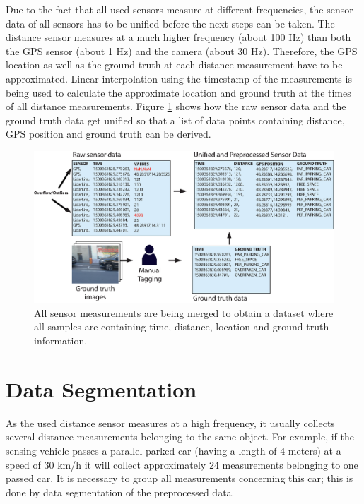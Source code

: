 Due to the fact that all used sensors measure at different frequencies, the sensor data of all sensors has to be unified before the next steps can be taken. The distance sensor measures at a much higher frequency (about 100 Hz) than both the GPS sensor (about 1 Hz) and the camera (about 30 Hz). Therefore, the GPS location as well as the ground truth at each distance measurement have to be approximated. Linear interpolation using the timestamp of the measurements is being used to calculate the approximate location and ground truth at the times of all distance measurements. Figure \ref{fig:preprocessing_dataset} shows how the raw sensor data and the ground truth data get unified so that a list of data points containing distance, GPS position and ground truth can be derived.

\begin{figure}
	\centering
	\includegraphics[width=\textwidth]{img/dataset-preprocessing.eps}
	\caption{ All sensor measurements are being merged to obtain a dataset where all samples are containing time, distance, location and ground truth information.}
	\label{fig:preprocessing_dataset}
\end{figure}





\section{Data Segmentation}
\label{sec:data_segmentation}

As the used distance sensor measures at a high frequency, it usually collects several distance measurements belonging to the same object. For example, if the sensing vehicle passes a parallel parked car (having a length of 4 meters) at a speed of 30 km/h it will collect approximately 24 measurements belonging to one passed car. It is necessary to group all measurements concerning this car; this is done by data segmentation of the preprocessed data.


